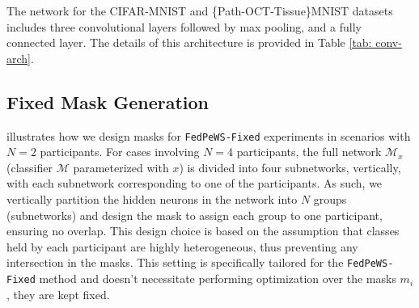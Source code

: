 \documentclass{article}
\begin{document}
The network for the CIFAR-MNIST and \{Path-OCT-Tissue\}MNIST datasets includes three convolutional layers followed by max pooling, and a fully connected layer. The details of this architecture is provided in Table \ref{tab: conv-arch}. 
\begin{table}[H]
    \centering
    \caption{Architecture for CIFAR-MNIST dataset models. Every convolutional layer is followed by a max pooling layer with kernel size 2 and stride 2. }
    \label{tab: conv-arch}
\end{table}


\subsection{Fixed Mask Generation} 
\label{subsection: fixed-mask-how-to}
 illustrates how we design masks for \texttt{FedPeWS-Fixed} experiments in scenarios with $N=2$ participants. For cases involving $N=4$ participants, the full network $\mathcal{M}_x$ (classifier $\mathcal{M}$ parameterized with $x$) is divided into four subnetworks, vertically, with each subnetwork corresponding to one of the participants. As such, we vertically partition the hidden neurons in the network into $N$ groups (subnetworks) and design the mask to assign each group to one participant, ensuring no overlap. This design choice is based on the assumption that classes held by each participant are highly heterogeneous, thus preventing any intersection in the masks. This setting is specifically tailored for the \texttt{FedPeWS-Fixed} method and doesn't necessitate performing optimization over the masks $m_i$, they are kept fixed.
\end{document}
